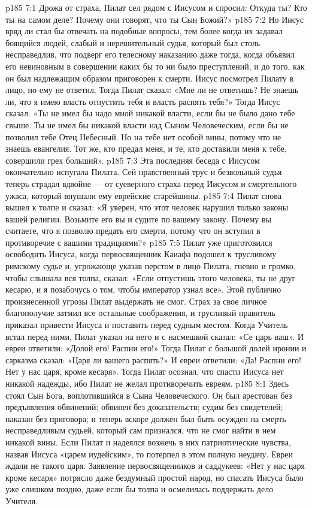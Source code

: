 \vs p185 7:1 Дрожа от страха, Пилат сел рядом с Иисусом и спросил: Откуда ты? Кто ты на самом деле? Почему они говорят, что ты Сын Божий?»
\vs p185 7:2 Но Иисус вряд ли стал бы отвечать на подобные вопросы, тем более когда их задавал боящийся людей, слабый и нерешительный судья, который был столь несправедлив, что подверг его телесному наказанию даже тогда, когда объявил его невиновным в совершении каких бы то ни было преступлений, и до того, как он был надлежащим образом приговорен к смерти. Иисус посмотрел Пилату в лицо, но ему не ответил. Тогда Пилат сказал: «Мне ли не ответишь? Не знаешь ли, что я имею власть отпустить тебя и власть распять тебя?» Тогда Иисус сказал: «Ты не имел бы надо мной никакой власти, если бы не было дано тебе свыше. Ты не имел бы никакой власти над Сыном Человеческим, если бы не позволил тебе Отец Небесный. Но на тебе нет особой вины, потому что не знаешь евангелия. Тот же, кто предал меня, и те, кто доставили меня к тебе, совершили грех больший».
\vs p185 7:3 Эта последняя беседа с Иисусом окончательно испугала Пилата. Сей нравственный трус и безвольный судья теперь страдал вдвойне --- от суеверного страха перед Иисусом и смертельного ужаса, который внушали ему еврейские старейшины.
\vs p185 7:4 Пилат снова вышел к толпе и сказал: «Я уверен, что этот человек нарушил только законы вашей религии. Возьмите его вы и судите по вашему закону. Почему вы считаете, что я позволю предать его смерти, потому что он вступил в противоречие с вашими традициями?»
\vs p185 7:5 Пилат уже приготовился освободить Иисуса, когда первосвященник Каиафа подошел к трусливому римскому судье и, угрожающе указав перстом в лицо Пилата, гневно и громко, чтобы слышала вся толпа, сказал: «Если отпустишь этого человека, ты не друг кесарю, и я позабочусь о том, чтобы император узнал все». Этой публично произнесенной угрозы Пилат выдержать не смог. Страх за свое личное благополучие затмил все остальные соображения, и трусливый правитель приказал привести Иисуса и поставить перед судным местом. Когда Учитель встал перед ними, Пилат указал на него и с насмешкой сказал: «Се царь ваш». И евреи ответили: «Долой его! Распни его!» Тогда Пилат с большой долей иронии и сарказма сказал: «Царя ли вашего распять?» И евреи ответили: «Да! Распни его! Нет у нас царя, кроме кесаря». Тогда Пилат осознал, что спасти Иисуса нет никакой надежды, ибо Пилат не желал противоречить евреям.
\vs p185 8:1 Здесь стоял Сын Бога, воплотившийся в Сына Человеческого. Он был арестован без предъявления обвинений; обвинен без доказательств; судим без свидетелей; наказан без приговора; и теперь вскоре должен был быть осужден на смерть несправедливым судьей, который сам признался, что не смог найти в нем никакой вины. Если Пилат и надеялся возжечь в них патриотические чувства, назвав Иисуса «царем иудейским», то потерпел в этом полную неудачу. Евреи ждали не такого царя. Заявление первосвященников и саддукеев: «Нет у нас царя кроме кесаря» потрясло даже бездумный простой народ, но спасать Иисуса было уже слишком поздно, даже если бы толпа и осмелилась поддержать дело Учителя.
